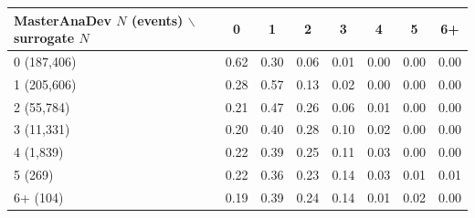\begin{tabular}{lccccccc}
\toprule
MasterAnaDev $N$ (events) $\backslash$ surrogate $N$ & 0 & 1 & 2 & 3 & 4 & 5 & 6+ \\
\midrule
0 (187,406) & 0.62 & 0.30 & 0.06 & 0.01 & 0.00 & 0.00 & 0.00 \\
1 (205,606) & 0.28 & 0.57 & 0.13 & 0.02 & 0.00 & 0.00 & 0.00 \\
2 (55,784) & 0.21 & 0.47 & 0.26 & 0.06 & 0.01 & 0.00 & 0.00 \\
3 (11,331) & 0.20 & 0.40 & 0.28 & 0.10 & 0.02 & 0.00 & 0.00 \\
4 (1,839) & 0.22 & 0.39 & 0.25 & 0.11 & 0.03 & 0.00 & 0.00 \\
5 (269) & 0.22 & 0.36 & 0.23 & 0.14 & 0.03 & 0.01 & 0.01 \\
6+ (104) & 0.19 & 0.39 & 0.24 & 0.14 & 0.01 & 0.02 & 0.00 \\
\bottomrule
\end{tabular}
